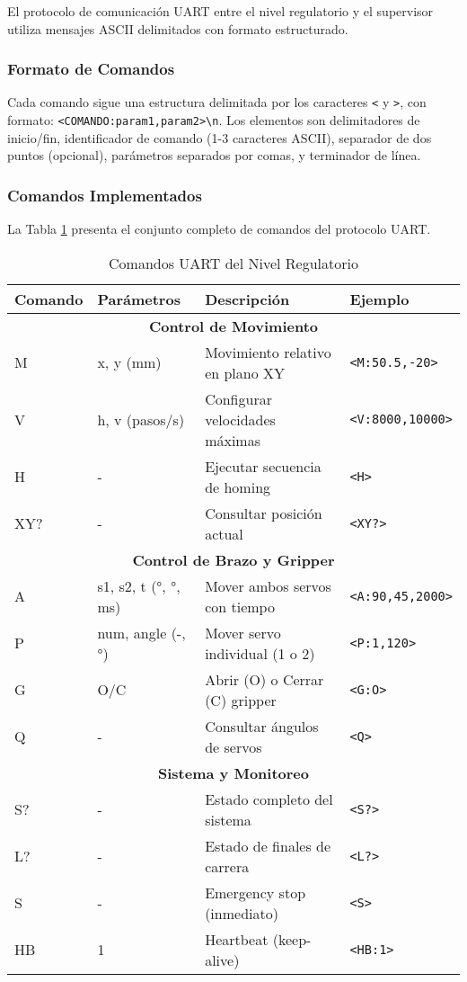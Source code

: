 El protocolo de comunicación UART entre el nivel regulatorio y el supervisor utiliza mensajes ASCII delimitados con formato estructurado.

\subsubsection{Formato de Comandos}

Cada comando sigue una estructura delimitada por los caracteres \texttt{<} y \texttt{>}, con formato: \texttt{<COMANDO:param1,param2>\textbackslash n}. Los elementos son delimitadores de inicio/fin, identificador de comando (1-3 caracteres ASCII), separador de dos puntos (opcional), parámetros separados por comas, y terminador de línea.

\subsubsection{Comandos Implementados}

La Tabla \ref{tab:comandos_uart} presenta el conjunto completo de comandos del protocolo UART.

\begin{table}[H]
\centering
\caption{Comandos UART del Nivel Regulatorio}
\label{tab:comandos_uart}
\small
\begin{tabular}{|l|l|p{5cm}|l|}
\hline
\textbf{Comando} & \textbf{Parámetros} & \textbf{Descripción} & \textbf{Ejemplo} \\
\hline
\multicolumn{4}{|c|}{\textbf{Control de Movimiento}} \\
\hline
M & x, y (mm) & Movimiento relativo en plano XY & \texttt{<M:50.5,-20>} \\
\hline
V & h, v (pasos/s) & Configurar velocidades máximas & \texttt{<V:8000,10000>} \\
\hline
H & - & Ejecutar secuencia de homing & \texttt{<H>} \\
\hline
XY? & - & Consultar posición actual & \texttt{<XY?>} \\
\hline
\multicolumn{4}{|c|}{\textbf{Control de Brazo y Gripper}} \\
\hline
A & s1, s2, t (°, °, ms) & Mover ambos servos con tiempo & \texttt{<A:90,45,2000>} \\
\hline
P & num, angle (-, °) & Mover servo individual (1 o 2) & \texttt{<P:1,120>} \\
\hline
G & O/C & Abrir (O) o Cerrar (C) gripper & \texttt{<G:O>} \\
\hline
Q & - & Consultar ángulos de servos & \texttt{<Q>} \\
\hline
\multicolumn{4}{|c|}{\textbf{Sistema y Monitoreo}} \\
\hline
S? & - & Estado completo del sistema & \texttt{<S?>} \\
\hline
L? & - & Estado de finales de carrera & \texttt{<L?>} \\
\hline
S & - & Emergency stop (inmediato) & \texttt{<S>} \\
\hline
HB & 1 & Heartbeat (keep-alive) & \texttt{<HB:1>} \\
\hline
\end{tabular}
\end{table}


